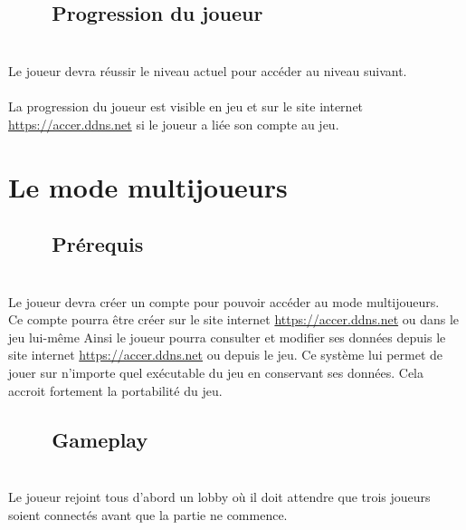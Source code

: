 \documentclass[titlepage, 13px, a4paper]{report}
\begin{document}
\subsection[Progression du joueur]{~~~~Progression du joueur}
\paragraph{} \hspace{0pt} \\
Le joueur devra réussir le niveau actuel pour accéder au niveau suivant. \\ \\
La progression du joueur est visible en jeu et sur le site internet \url{https://accer.ddns.net} si le joueur a liée son compte au jeu. \\

\newpage

\section{Le mode multijoueurs}

\subsection[Prérequis]{~~~~Prérequis}
\paragraph{} \hspace{0pt} \\
Le joueur devra créer un compte pour pouvoir accéder au mode multijoueurs. \\
Ce compte pourra être créer sur le site internet \url{https://accer.ddns.net} ou dans le jeu lui-même Ainsi le joueur pourra 
consulter et modifier ses données depuis le site internet \url{https://accer.ddns.net} ou depuis le jeu. Ce système lui permet 
de jouer sur n’importe quel exécutable du jeu en conservant ses données. 
Cela accroit fortement la portabilité du jeu. \\

\subsection[Gameplay]{~~~~Gameplay}
\paragraph{} \hspace{0pt} \\
Le joueur rejoint tous d’abord un lobby où il doit attendre que trois joueurs 
soient connectés avant que la partie ne commence.
\end{document}
